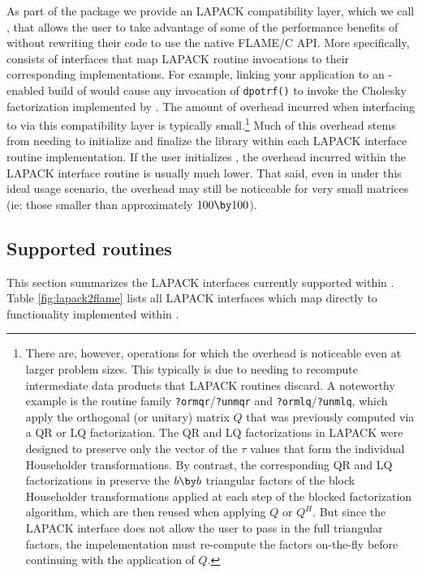 As part of the \libflame package we provide an LAPACK compatibility
layer, which we call \lapacktflamens, that allows the user to take advantage of
some of the performance benefits of \libflame without rewriting their
code to use the native FLAME/C API.
More specifically, \lapacktflame consists of interfaces that map
LAPACK routine invocations to their corresponding \libflame implementations.
For example, linking your application to an \lapacktflamens-enabled
build of \libflame would cause any invocation of {\tt dpotrf()} to invoke
the Cholesky factorization implemented by \flacholns.
The amount of overhead incurred when interfacing to \libflame via this
compatibility layer is typically
small.\footnote{
There are, however, operations for which the overhead is noticeable even at
larger problem sizes.
This typically is due to \libflame needing to recompute intermediate data
products that LAPACK routines discard.
A noteworthy example is the routine family {\tt ?ormqr}/{\tt ?unmqr} and
{\tt ?ormlq}/{\tt ?unmlq}, which apply the orthogonal (or unitary) matrix
$ Q $ that was previously computed via a QR or LQ factorization.
The QR and LQ factorizations in LAPACK were designed to preserve only the vector
of the $ \tau $ values that form the individual Householder transformations.
By contrast, the corresponding QR and LQ factorizations in \libflame preserve
the $ b \by b $ triangular factors of the block Householder transformations
applied at each step of the blocked factorization algorithm, which are then
reused when applying $ Q $ or $ Q^H $.
But since the LAPACK interface does not allow the user to pass in the full
triangular factors, the \lapacktflame impelementation must re-compute the
factors on-the-fly before continuing with the application of $ Q $.
}
Much of this overhead stems from needing to initialize and finalize the
library within each LAPACK interface routine implementation.
If the user initializes , the overhead
incurred within the LAPACK interface routine is usually much lower.
That said, even in under this ideal usage scenario, the overhead may still
be noticeable for very small matrices
(ie: those smaller than approximately $ 100 \by 100 $).


\subsection{Supported routines}

This section summarizes the LAPACK interfaces currently supported within
\lapacktflamens.
Table \ref{fig:lapack2flame} lists all LAPACK interfaces which map directly
to functionality implemented within \libflamens.

